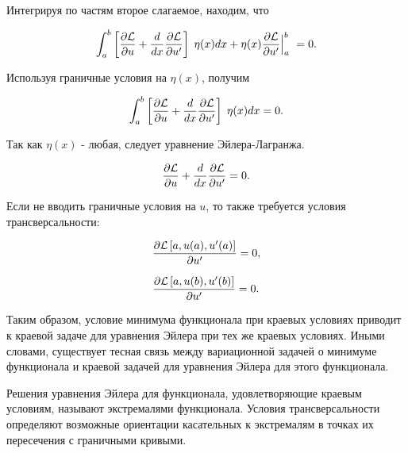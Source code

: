 \documentclass{article}
\begin{document}
\noindent Интегрируя по частям второе слагаемое, находим, что 

\begin{displaymath}
	\int_{a}^{b} \left[\frac{\partial \mathcal{L}}{\partial u} + \frac{d}{dx} \frac{\partial \mathcal{L}}{\partial u'} \right]  \; \eta(x) dx + \eta(x) \frac{\partial \mathcal{L}}{\partial u'} \Big|_a^b \ = 0.
\end{displaymath}

\noindent Используя граничные условия на $\eta(x)$, получим

\begin{displaymath}
	\int_{a}^{b} \left[\frac{\partial \mathcal{L}}{\partial u} + \frac{d}{dx} \frac{\partial \mathcal{L}}{\partial u'} \right]  \; \eta(x) dx = 0.
\end{displaymath}

\noindent Так как $\eta(x)$ - любая, следует уравнение Эйлера-Лагранжа.

\begin{displaymath}
	\frac{\partial \mathcal{L}}{\partial u} + \frac{d}{dx} \frac{\partial \mathcal{L}}{\partial u'} = 0.
\end{displaymath}

\noindent Если не вводить граничные условия на $u$, то также требуется условия трансверсальности:

\begin{displaymath}
	\frac{\partial \mathcal{L} \left[a, u(a), u'(a) \right] }{\partial u'} = 0,
\end{displaymath}

\begin{displaymath}
	\frac{\partial \mathcal{L} \left[a, u(b), u'(b) \right] }{\partial u'} = 0.
\end{displaymath}


Таким образом, условие минимума функционала при краевых условиях приводит к краевой задаче для уравнения Эйлера при тех же краевых условиях. Иными словами, существует тесная связь между вариационной задачей о минимуме функционала и краевой задачей для уравнения Эйлера для этого функционала.

\begin{warn}[Важно!]
	Решения уравнения Эйлера для функционала, удовлетворяющие краевым условиям, называют экстремалями функционала. Условия трансверсальности определяют возможные ориентации касательных к экстремалям в точках их пересечения с граничными кривыми.
\end{warn}

\end{document}
